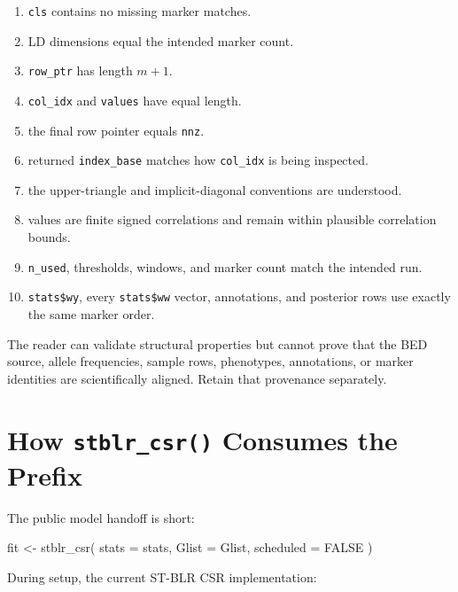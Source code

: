 \documentclass[
  11pt,
  letterpaper,
  DIV=11,
  numbers=noendperiod]{scrartcl}
\newenvironment{Shaded}{\begin{snugshade}}{\end{snugshade}}
\newcommand{\AttributeTok}[1]{\textcolor[rgb]{0.00,0.34,0.68}{#1}}
\newcommand{\ConstantTok}[1]{\textcolor[rgb]{0.67,0.33,0.00}{#1}}
\newcommand{\FunctionTok}[1]{\textcolor[rgb]{0.39,0.29,0.61}{#1}}
\newcommand{\NormalTok}[1]{\textcolor[rgb]{0.12,0.11,0.11}{#1}}
\newcommand{\OtherTok}[1]{\textcolor[rgb]{0.00,0.43,0.16}{#1}}
\providecommand{\tightlist}{%
  \setlength{\itemsep}{0pt}\setlength{\parskip}{0pt}}
\begin{document}
\begin{enumerate}
\def\labelenumi{\arabic{enumi}.}
\tightlist
\item
  \texttt{cls} contains no missing marker matches.
\item
  LD dimensions equal the intended marker count.
\item
  \texttt{row\_ptr} has length \(m+1\).
\item
  \texttt{col\_idx} and \texttt{values} have equal length.
\item
  the final row pointer equals \texttt{nnz}.
\item
  returned \texttt{index\_base} matches how \texttt{col\_idx} is being
  inspected.
\item
  the upper-triangle and implicit-diagonal conventions are understood.
\item
  values are finite signed correlations and remain within plausible
  correlation bounds.
\item
  \texttt{n\_used}, thresholds, windows, and marker count match the
  intended run.
\item
  \texttt{stats\$wy}, every \texttt{stats\$ww} vector, annotations, and
  posterior rows use exactly the same marker order.
\end{enumerate}

The reader can validate structural properties but cannot prove that the
BED source, allele frequencies, sample rows, phenotypes, annotations, or
marker identities are scientifically aligned. Retain that provenance
separately.

\section{\texorpdfstring{How \texttt{stblr\_csr()} Consumes the
Prefix}{How stblr\_csr() Consumes the Prefix}}\label{how-stblr_csr-consumes-the-prefix}

The public model handoff is short:

\begin{Shaded}
\begin{Highlighting}[]
\NormalTok{fit }\OtherTok{\textless{}{-}} \FunctionTok{stblr\_csr}\NormalTok{(}
  \AttributeTok{stats =}\NormalTok{ stats,}
  \AttributeTok{Glist =}\NormalTok{ Glist,}
  \AttributeTok{scheduled =} \ConstantTok{FALSE}
\NormalTok{)}
\end{Highlighting}
\end{Shaded}

During setup, the current ST-BLR CSR implementation:
\end{document}

